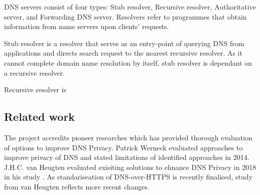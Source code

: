 \documentclass[a4paper,12pt]{article}
\begin{document}
DNS servers consist of four types: Stub resolver, Recursive resolver, Authoritative server, and Forwarding DNS server. Resolvers refer to programmes that obtain information from name servers upon clients' requests\cite{rfc1034}.

Stub resolver is a resolver that serves as an entry-point of querying DNS from applications and directs search request to the nearest recursive resolver\cite{rfc1123}. As it cannot complete domain name resolution by itself, stub resolver is dependant on a recursive resolver\cite{rfc8499}.

Recursive resolver is 
\subsection{Related work}
The project accredits pioneer researches which has provided thorough evaluation of options to improve DNS Privacy. 
Patrick Werneck evaluated approaches to improve privacy of DNS and stated limitations of identified approaches\cite{werneck2014dns} in 2014.
J.H.C. van Heugten evaluated exisiting solutions to ehnance DNS Privacy in 2018 in his study \cite{van2018privacy}. As standariseation of DNS-over-HTTPS is recently finalised\cite{rfc8484}, study from van Heugten reflects more recent changes.
\end{document}

